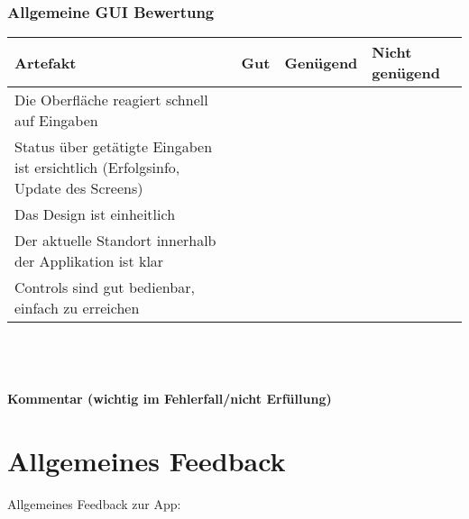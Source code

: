 \documentclass[10pt,a4paper]{scrartcl}
\begin{document}
\subsubsection*{Allgemeine GUI Bewertung}
\begin{tabular}{|p{}|p{}|p{}|p{}|}
\hline 
\rule[-1ex]{0pt}{2.5ex} \textbf{Artefakt} & \textbf{Gut} & \textbf{Genügend} & \textbf{Nicht genügend} \\ 
\hline 
\rule[-1ex]{0pt}{2.5ex} Die Oberfläche reagiert schnell auf Eingaben &  &  &  \\ 
\hline 
\rule[-1ex]{0pt}{2.5ex} Status über getätigte Eingaben ist ersichtlich (Erfolgsinfo, Update des Screens) &  &  &  \\ 
\hline 
\rule[-1ex]{0pt}{2.5ex} Das Design ist einheitlich &  &  &  \\ 
\hline 
\rule[-1ex]{0pt}{2.5ex} Der aktuelle Standort innerhalb der Applikation ist klar &  &  &  \\ 
\hline 
\rule[-1ex]{0pt}{2.5ex} Controls sind gut bedienbar, einfach zu erreichen &  &  &  \\  
\hline 
\end{tabular} 
\\
\\
\\
\textbf{Kommentar (wichtig im Fehlerfall/nicht Erfüllung)}
\vspace*{4cm}


\newpage
\section{Allgemeines Feedback}
Allgemeines Feedback zur App:
\end{document}
